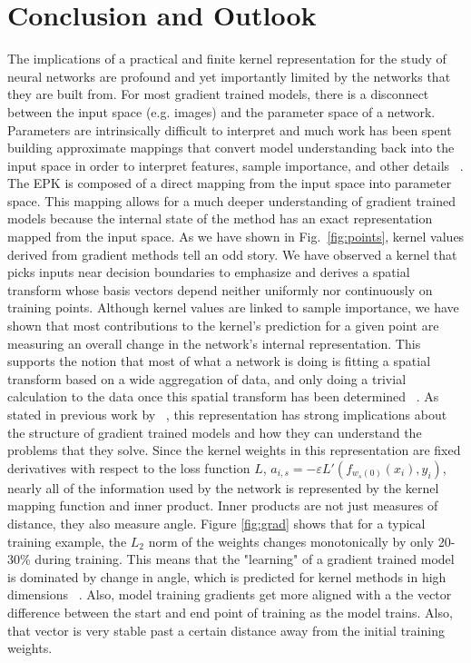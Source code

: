 \section{Conclusion and Outlook} %
The implications of a practical and finite kernel representation for the study of neural networks are profound and yet importantly limited by the networks that they are built from. For most gradient trained models, there is a disconnect between the input space (e.g. images) and the parameter space of a network. Parameters are intrinsically difficult to interpret and much work has been spent building approximate mappings that convert model understanding back into the input space in order to interpret features, sample importance, and other details ~\citep{simonyan2013deep, lundberg2017unified, Selvaraju_2019}. The EPK is composed of a direct mapping from the input space into parameter space. This mapping allows for a much deeper understanding of gradient trained models because the internal state of the method has an exact representation mapped from the input space. As we have shown in Fig.~\ref{fig:points}, kernel values derived from gradient methods tell an odd story. We have observed a kernel that picks inputs near decision boundaries to emphasize and derives a spatial transform whose basis vectors depend neither uniformly nor continuously on training points. Although kernel values are linked to sample importance, we have shown that most contributions to the kernel's prediction for a given point are measuring an overall change in the network's internal representation. This supports the notion that most of what a network is doing is fitting a spatial transform based on a wide aggregation of data, and only doing a trivial calculation to the data once this spatial transform has been determined ~\citep{chizat2020maxmargin}. 
As stated in previous work by ~\citet{domingos2020}, this representation has strong implications about the structure of gradient trained models and how they can understand the problems that they solve. Since the kernel weights in this representation are fixed derivatives with respect to the loss function $L$, $a_{i, s} = -\varepsilon  L'(f_{w_s(0)}(x_i),  y_i)$, nearly all of the information used by the network is represented by the kernel mapping function and inner product. Inner products are not just measures of distance, they also measure angle. Figure \ref{fig:grad} shows that for a typical training example, the $L_2$ norm of the weights changes monotonically by only 20-30\% during training. This means that the "learning" of a gradient trained model is dominated by change in angle, which is predicted for kernel methods in high dimensions ~\citep{hardle2004nonparametric}. Also, model training gradients get more aligned with a the vector difference between the start and end point of training as the model trains. Also, that vector is very stable past a certain distance away from the initial training weights.

